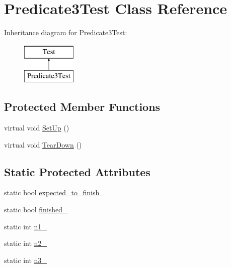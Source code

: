 \hypertarget{classPredicate3Test}{\section{\-Predicate3\-Test \-Class \-Reference}
\label{d5/d43/classPredicate3Test}
}
\-Inheritance diagram for \-Predicate3\-Test\-:\begin{figure}[H]
\begin{center}
\leavevmode
\includegraphics[height=2.000000cm]{d5/d43/classPredicate3Test}
\end{center}
\end{figure}
\subsection*{\-Protected \-Member \-Functions}
\begin{DoxyCompactItemize}
\item 
virtual void \hyperlink{classPredicate3Test_a901706a587f9ae84df8b2395fbe759cb}{\-Set\-Up} ()
\item 
virtual void \hyperlink{classPredicate3Test_a870a092058305911f3d42df45dd657e5}{\-Tear\-Down} ()
\end{DoxyCompactItemize}
\subsection*{\-Static \-Protected \-Attributes}
\begin{DoxyCompactItemize}
\item 
static bool \hyperlink{classPredicate3Test_af30fae6aaebdd5a6cb055c420573754d}{expected\-\_\-to\-\_\-finish\-\_\-}
\item 
static bool \hyperlink{classPredicate3Test_a9189d6cfedf2ace6f5f6aa152ba38f83}{finished\-\_\-}
\item 
static int \hyperlink{classPredicate3Test_a7a61c539c18d10f12696fc25b115d699}{n1\-\_\-}
\item 
static int \hyperlink{classPredicate3Test_a7dc886196252de63d1ca064997069377}{n2\-\_\-}
\item 
static int \hyperlink{classPredicate3Test_a08d9124d5401436eacd3e57dae0dbe2f}{n3\-\_\-}
\end{DoxyCompactItemize}


